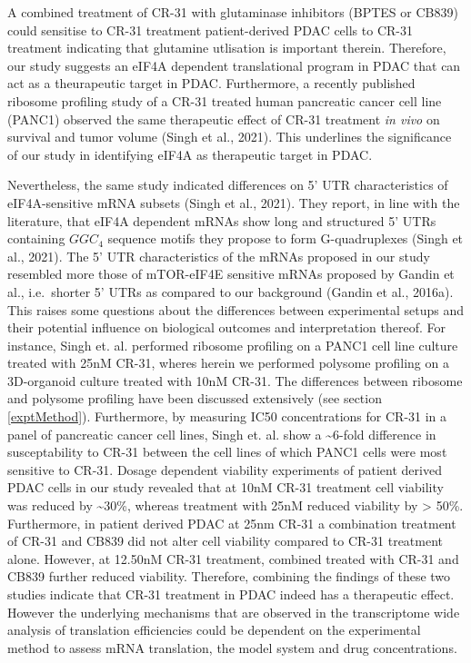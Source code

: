 \documentclass[12pt,openany]{book}
\begin{document}
A combined treatment of CR-31 with glutaminase inhibitors (BPTES or
CB839) could sensitise to CR-31 treatment patient-derived PDAC cells to
CR-31 treatment indicating that glutamine utlisation is important
therein. Therefore, our study suggests an eIF4A dependent translational
program in PDAC that can act as a theurapeutic target in PDAC.
Furthermore, a recently published ribosome profiling study of a CR-31
treated human pancreatic cancer cell line (PANC1) observed the same
therapeutic effect of CR-31 treatment \emph{in vivo} on survival and
tumor volume (Singh et al., 2021). This underlines the significance of
our study in identifying eIF4A as therapeutic target in PDAC.

Nevertheless, the same study indicated differences on 5' UTR
characteristics of eIF4A-sensitive mRNA subsets (Singh et al., 2021).
They report, in line with the literature, that eIF4A dependent mRNAs
show long and structured 5' UTRs containing \(GGC_4\) sequence motifs
they propose to form G-quadruplexes (Singh et al., 2021). The 5' UTR
characteristics of the mRNAs proposed in our study resembled more those
of mTOR-eIF4E sensitive mRNAs proposed by Gandin et al., i.e.~shorter 5'
UTRs as compared to our background (Gandin et al., 2016a). This raises
some questions about the differences between experimental setups and
their potential influence on biological outcomes and interpretation
thereof. For instance, Singh et. al. performed ribosome profiling on a
PANC1 cell line culture treated with 25nM CR-31, wheres herein we
performed polysome profiling on a 3D-organoid culture treated with 10nM
CR-31. The differences between ribosome and polysome profiling have been
discussed extensively (see section \ref{exptMethod}). Furthermore, by
measuring IC50 concentrations for CR-31 in a panel of pancreatic cancer
cell lines, Singh et. al. show a \textasciitilde{}6-fold difference in
susceptability to CR-31 between the cell lines of which PANC1 cells were
most sensitive to CR-31. Dosage dependent viability experiments of
patient derived PDAC cells in our study revealed that at 10nM CR-31
treatment cell viability was reduced by \textasciitilde{}30\%, whereas
treatment with 25nM reduced viability by \textgreater{} 50\%.
Furthermore, in patient derived PDAC at 25nm CR-31 a combination
treatment of CR-31 and CB839 did not alter cell viability compared to
CR-31 treatment alone. However, at 12.50nM CR-31 treatment, combined
treated with CR-31 and CB839 further reduced viability. Therefore,
combining the findings of these two studies indicate that CR-31
treatment in PDAC indeed has a therapeutic effect. However the
underlying mechanisms that are observed in the transcriptome wide
analysis of translation efficiencies could be dependent on the
experimental method to assess mRNA translation, the model system and
drug concentrations. \newline
\end{document}
